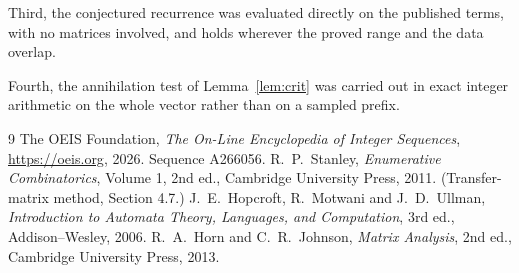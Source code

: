 \documentclass[11pt,a4paper]{article}
\theoremstyle{plain}
\theoremstyle{definition}
\begin{document}
Third, the conjectured recurrence was evaluated directly on the published terms, with no
matrices involved, and holds wherever the proved range and the data overlap.

Fourth, the annihilation test of Lemma~\ref{lem:crit} was carried out in exact integer
arithmetic on the whole vector rather than on a sampled prefix.

\begin{thebibliography}{9}
 The OEIS Foundation, \emph{The On-Line Encyclopedia of Integer
Sequences}, \url{https://oeis.org}, 2026. Sequence A266056.
 R.~P.~Stanley, \emph{Enumerative Combinatorics}, Volume 1, 2nd ed.,
Cambridge University Press, 2011. (Transfer-matrix method, Section 4.7.)
 J.~E.~Hopcroft, R.~Motwani and J.~D.~Ullman, \emph{Introduction to Automata
Theory, Languages, and Computation}, 3rd ed., Addison--Wesley, 2006.
 R.~A.~Horn and C.~R.~Johnson, \emph{Matrix Analysis}, 2nd ed., Cambridge
University Press, 2013.
\end{thebibliography}
\end{document}
